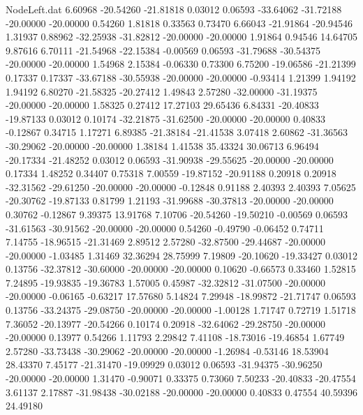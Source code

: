 \begin{filecontents}{NodeLeft.dat}
   6.60968  -20.54260  -21.81818     0.03012    0.06593  -33.64062  -31.72188  -20.00000  -20.00000    0.54260    1.81818    0.33563    0.73470
   6.66043  -21.91864  -20.94546     1.31937    0.88962  -32.25938  -31.82812  -20.00000  -20.00000    1.91864    0.94546   14.64705    9.87616
   6.70111  -21.54968  -22.15384    -0.00569    0.06593  -31.79688  -30.54375  -20.00000  -20.00000    1.54968    2.15384   -0.06330    0.73300
   6.75200  -19.06586  -21.21399     0.17337    0.17337  -33.67188  -30.55938  -20.00000  -20.00000   -0.93414    1.21399    1.94192    1.94192
   6.80270  -21.58325  -20.27412     1.49843    2.57280  -32.00000  -31.19375  -20.00000  -20.00000    1.58325    0.27412   17.27103   29.65436
   6.84331  -20.40833  -19.87133     0.03012    0.10174  -32.21875  -31.62500  -20.00000  -20.00000    0.40833   -0.12867    0.34715    1.17271
   6.89385  -21.38184  -21.41538     3.07418    2.60862  -31.36563  -30.29062  -20.00000  -20.00000    1.38184    1.41538   35.43324   30.06713
   6.96494  -20.17334  -21.48252     0.03012    0.06593  -31.90938  -29.55625  -20.00000  -20.00000    0.17334    1.48252    0.34407    0.75318
   7.00559  -19.87152  -20.91188     0.20918    0.20918  -32.31562  -29.61250  -20.00000  -20.00000   -0.12848    0.91188    2.40393    2.40393
   7.05625  -20.30762  -19.87133     0.81799    1.21193  -31.99688  -30.37813  -20.00000  -20.00000    0.30762   -0.12867    9.39375   13.91768
   7.10706  -20.54260  -19.50210    -0.00569    0.06593  -31.61563  -30.91562  -20.00000  -20.00000    0.54260   -0.49790   -0.06452    0.74711
   7.14755  -18.96515  -21.31469     2.89512    2.57280  -32.87500  -29.44687  -20.00000  -20.00000   -1.03485    1.31469   32.36294   28.75999
   7.19809  -20.10620  -19.33427     0.03012    0.13756  -32.37812  -30.60000  -20.00000  -20.00000    0.10620   -0.66573    0.33460    1.52815
   7.24895  -19.93835  -19.36783     1.57005    0.45987  -32.32812  -31.07500  -20.00000  -20.00000   -0.06165   -0.63217   17.57680    5.14824
   7.29948  -18.99872  -21.71747     0.06593    0.13756  -33.24375  -29.08750  -20.00000  -20.00000   -1.00128    1.71747    0.72719    1.51718
   7.36052  -20.13977  -20.54266     0.10174    0.20918  -32.64062  -29.28750  -20.00000  -20.00000    0.13977    0.54266    1.11793    2.29842
   7.41108  -18.73016  -19.46854     1.67749    2.57280  -33.73438  -30.29062  -20.00000  -20.00000   -1.26984   -0.53146   18.53904   28.43370
   7.45177  -21.31470  -19.09929     0.03012    0.06593  -31.94375  -30.96250  -20.00000  -20.00000    1.31470   -0.90071    0.33375    0.73060
   7.50233  -20.40833  -20.47554     3.61137    2.17887  -31.98438  -30.02188  -20.00000  -20.00000    0.40833    0.47554   40.59396   24.49180

\end{filecontents}
